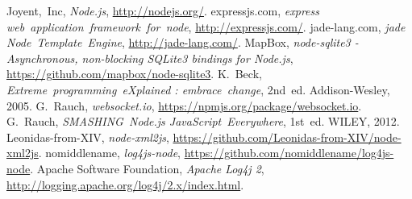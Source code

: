 \documentclass[journal]{IEEEtran}
\begin{document}
\begin{thebibliography}{1}

Joyent,~Inc, \emph{Node.js}, \url{http://nodejs.org/}.
expressjs.com, \emph{express web~application~framework~for~node}, \url{http://expressjs.com/}.
jade-lang.com, \emph{jade Node~Template~Engine}, \url{http://jade-lang.com/}.
MapBox, \emph{node-sqlite3 - Asynchronous, non-blocking SQLite3 bindings for Node.js}, \url{https://github.com/mapbox/node-sqlite3}.
K.~Beck, \emph{Extreme~programming~eXplained : embrace~change}, 2nd~ed. Addison-Wesley, 2005.
G.~Rauch, \emph{websocket.io}, \url{https://npmjs.org/package/websocket.io}.
G.~Rauch, \emph{SMASHING~Node.js JavaScript~Everywhere}, 1st~ed. WILEY, 2012.
Leonidas-from-XIV, \emph{node-xml2js}, \url{https://github.com/Leonidas-from-XIV/node-xml2js}.
nomiddlename, \emph{log4js-node}, \url{https://github.com/nomiddlename/log4js-node}.
Apache Software Foundation, \emph{Apache Log4j 2}, \url{http://logging.apache.org/log4j/2.x/index.html}.

\end{thebibliography}
\end{document}
